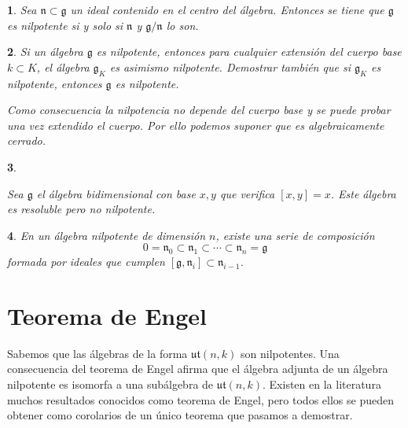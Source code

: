 \documentclass[a4paper,draft,12pt]{article}
\newtheorem{pro1}{}%
\newenvironment{pro}{\begin{pro1} \rm} {\end{pro1}}
\newcommand{\g}{\mathfrak{g}}%
\begin{document}
\begin{pro}

Sea $\mathfrak{n} \subset \g$ un ideal contenido en el centro del álgebra.  Entonces se tiene que $\g$ es nilpotente si y solo si $\mathfrak{n}$ y $\g/\mathfrak{n}$ lo son.

\end{pro}

\begin{pro}

Si un álgebra $\g$ es nilpotente, entonces para cualquier extensión del cuerpo base $k \subset K$, el álgebra $\g_K$ es asimismo nilpotente.  Demostrar también que si $\g_K$ es nilpotente, entonces $\g$ es nilpotente.

Como consecuencia la nilpotencia no depende del cuerpo base y se puede probar una vez extendido el cuerpo.  Por ello podemos suponer que es algebraicamente cerrado.

\end{pro}



\begin{pro}\label{pro:resolublenilpotente}

Sea $\g$ el álgebra bidimensional con base $x,y$ que verifica $[x,y]=x$.  Este álgebra es resoluble pero no nilpotente.

\end{pro}


\begin{pro}

En un álgebra nilpotente de dimensión $n$, existe una serie de composición
$$
0 = \mathfrak{n}_0 \subset \mathfrak{n}_1 \subset \cdots \subset \mathfrak{n}_n= \g
$$
formada por ideales que cumplen $[\g, \mathfrak{n}_i]\subset \mathfrak{n}_{i-1}$.

\end{pro}

\newpage

\section{Teorema de Engel}

Sabemos que las álgebras de la forma $\mathfrak{ut}(n,k)$ son nilpotentes.  Una consecuencia del teorema de  Engel afirma que el álgebra adjunta de un álgebra nilpotente  es isomorfa a una subálgebra de $\mathfrak{ut}(n,k)$.  Existen en la literatura muchos resultados conocidos como teorema de Engel, pero todos ellos se pueden obtener como corolarios de un único  teorema  que pasamos a demostrar.
\end{document}
